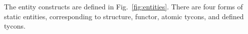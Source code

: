 \documentclass[9pt,nocopyrightspace, fleqn]{sigplanconf}
\begin{document}
% 



The entity constructs are defined in Fig.~\ref{fig:entities}.
There are four forms of static entities, corresponding to structure,
functor, atomic tycons, and defined tycons.
\end{document}
